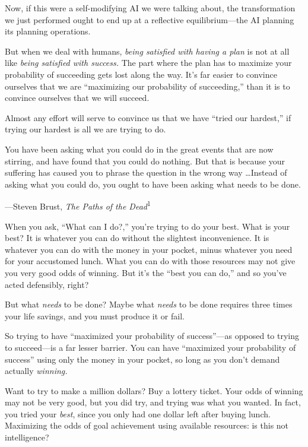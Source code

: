 {
 Now, if this were a self-modifying AI we were talking about, the
transformation we just performed ought to end up at a reflective
equilibrium---the AI planning its planning operations.}

{
 But when we deal with humans, \textit{being satisfied with having
a plan} is not at all like \textit{being satisfied with success.} The
part where the plan has to maximize your probability of succeeding gets
lost along the way. It's far easier to convince
ourselves that we are ``maximizing our probability of
succeeding,'' than it is to convince ourselves that
we will succeed.}

{
 Almost any effort will serve to convince us that we have
``tried our hardest,'' if trying our
hardest is all we are trying to do.}

{
 You have been asking what you could do in the great events that
are now stirring, and have found that you could do nothing. But that is
because your suffering has caused you to phrase the question in the
wrong way \ldots Instead of asking what you could do, you ought to have
been asking what needs to be done.}

{\raggedleft
 {}---Steven Brust, \textit{The Paths of the
Dead}\textsuperscript{1}
\par}


\bigskip

{
 When you ask, ``What can I
do?,'' you're trying to do your best.
What is your best? It is whatever you can do without the slightest
inconvenience. It is whatever you can do with the money in your pocket,
minus whatever you need for your accustomed lunch. What you can do with
those resources may not give you very good odds of winning. But
it's the ``best you can
do,'' and so you've acted defensibly,
right?}

{
 But what \textit{needs} to be done? Maybe what \textit{needs} to
be done requires three times your life savings, and you must produce it
or fail.}

{
 So trying to have ``maximized your probability of
success''---as opposed to trying to succeed---is a
far lesser barrier. You can have ``maximized your
probability of success'' using only the money in your
pocket, so long as you don't demand actually
\textit{winning.}}

{
 Want to try to make a million dollars? Buy a lottery ticket. Your
odds of winning may not be very good, but you did try, and trying was
what you wanted. In fact, you tried your \textit{best}, since you only
had one dollar left after buying lunch. Maximizing the odds of goal
achievement using available resources: is this not intelligence?}

